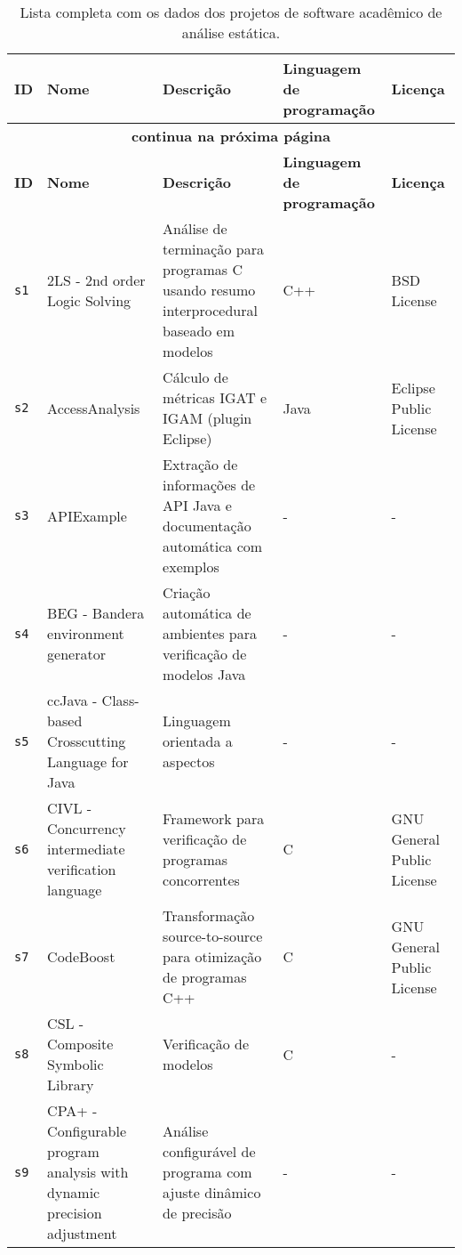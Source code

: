 \begin{longtable}{| l | p{4.5cm} | p{7cm} | p{2.5cm} | p{2.5cm} |}
  \caption{Lista completa com os dados dos projetos de software acadêmico de análise estática.}
  \label{software-table} \\
  \hline
  \endfirsthead
  \hline
  \textbf{ID} & \textbf{Nome} & \textbf{Descrição} & \textbf{Linguagem de programação} & \textbf{Licença} \\
  \hline
  \endhead
  \multicolumn{5}{c}{\textbf{continua na próxima página}} \\
  \hhline{-----} \endfoot
  \endlastfoot
  \textbf{ID} & \textbf{Nome} & \textbf{Descrição} & \textbf{Linguagem de programação} & \textbf{Licença} \\
  \hline
    \texttt{s1} &
      2LS - 2nd order Logic Solving &
      Análise de terminação para programas C usando resumo interprocedural baseado em modelos &
      C++ &
      BSD License \\
    \hline
    \texttt{s2} &
      AccessAnalysis &
      Cálculo de métricas IGAT e IGAM (plugin Eclipse) &
      Java &
      Eclipse Public License \\
    \hline
    \texttt{s3} &
      APIExample &
      Extração de informações de API Java e documentação automática com exemplos &
      - &
      - \\
    \hline
    \texttt{s4} &
      BEG - Bandera environment generator &
      Criação automática de ambientes para verificação de modelos Java &
      - &
      - \\
    \hline
    \texttt{s5} &
      ccJava - Class-based Crosscutting Language for Java &
      Linguagem orientada a aspectos &
      - &
      - \\
    \hline
    \texttt{s6} &
      CIVL - Concurrency intermediate verification language &
      Framework para verificação de programas concorrentes &
      C &
      GNU General Public License \\
    \hline
    \texttt{s7} &
      CodeBoost &
      Transformação source-to-source para otimização de programas C++ &
      C &
      GNU General Public License \\
    \hline
    \texttt{s8} &
      CSL - Composite Symbolic Library &
      Verificação de modelos &
      C &
      - \\
    \hline
    \texttt{s9} &
      CPA+ - Configurable program analysis with dynamic precision adjustment &
      Análise configurável de programa com ajuste dinâmico de precisão &
      - &
      - \\

\end{longtable}
